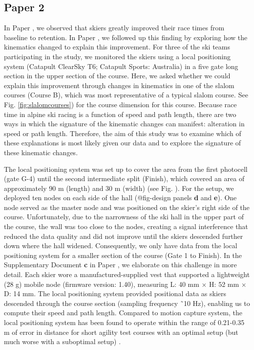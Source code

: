 \subsection{Paper 2}
In Paper , we observed that skiers greatly improved their race times from baseline to retention. In Paper , we followed up this finding by exploring how the kinematics changed to explain this improvement. For three of the ski teams participating in the study, we monitored the skiers using a local positioning system (Catapult ClearSky T6; Catapult Sports: Australia) in a five gate long section in the upper section of the course.  Here, we asked whether we could explain this improvement through changes in kinematics in one of the slalom courses (Course B), which was most representative of a typical slalom course. See Fig. \ref{fig:slalomcourses}) for the course dimension for this course. Because race time in alpine ski racing is a function of speed and path length, there are two ways in which the signature of the kinematic changes can manifest: alteration in speed or path length. Therefore, the aim of this study was to examine which of these explanations is most likely given our data and to explore the signature of these kinematic changes.

The local positioning system was set up to cover the area from the first photocell (gate G-4) until the second intermediate split (Finish), which covered an area of approximately 90 m (length) and 30 m (width) (see Fig. ). For the setup, we deployed ten nodes on each side of the hall (@fig-design panels \textbf{d} and \textbf{e}). One node served as the master node and was positioned on the skier’s right side of the course. Unfortunately, due to the narrowness of the ski hall in the upper part of the course, the wall was too close to the nodes, creating a signal interference that reduced the data quality and did not improve until the skiers descended further down where the hall widened. Consequently, we only have data from the local positioning system for a smaller section of the course (Gate 1 to Finish). In the Supplementary Document \textbf{c} in Paper , we elaborate on this challenge in more detail. Each skier wore a manufactured-supplied vest that supported a lightweight (28 g) mobile node (firmware version: 1.40), measuring L: 40 mm × H: 52 mm × D: 14 mm. The local positioning system provided positional data as skiers descended through the course section (sampling frequency ˜10 Hz), enabling us to compute their speed and path length. Compared to motion capture system, the local positioning system has been found to operate within the range of 0.21-0.35 m of error in distance for short agility test courses with an optimal setup (but much worse with a suboptimal setup) \cite{luteberget_validity_2018}. 

